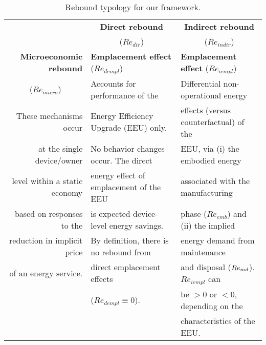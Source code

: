 


\begin{table}
\footnotesize
\begin{center}
\caption{Rebound typology for our framework.}
\label{tab:rebound_typology}
\begin{tabular}{ r l l }
\toprule
                                   & \multicolumn{1}{c}{\textbf{Direct rebound}}  & \multicolumn{1}{c}{\textbf{Indirect rebound}} \\
                                   & \multicolumn{1}{c}{($Re_{dir}$)}             & \multicolumn{1}{c}{($Re_{indir}$)}            \\
\midrule
\textbf{Microeconomic rebound}     & \textbf{Emplacement effect} ($Re_{dempl}$)   & \textbf{Emplacement effect} ($Re_{iempl}$) \\
\multicolumn{1}{c}{($Re_{micro}$)} & Accounts for performance of the              & Differential non-operational energy  \\
These mechanisms occur             & Energy Efficiency Upgrade (EEU) only.        & effects (versus counterfactual) of the  \\
at the single device/owner         & No behavior changes occur. The direct        & EEU, via (i) the embodied energy  \\
level within a static economy      & energy effect of emplacement of the EEU      & associated with the manufacturing  \\
based on responses to the          & is expected device-level energy savings.     & phase ($Re_{emb}$) and (ii) the implied  \\
reduction in implicit price        & By definition, there is no rebound from      & energy demand from maintenance   \\
of an energy service.              & direct emplacement effects                   & and disposal ($Re_{md}$). $Re_{iempl}$ can  \\
                                   & ($Re_{dempl} \equiv 0$).                     & be $> 0$ or $< 0$, depending on the   \\
                                   &                                              & characteristics of the EEU.        \\
                                   \cmidrule{2-3}

\end{tabular}
\end{center}
\end{table}
